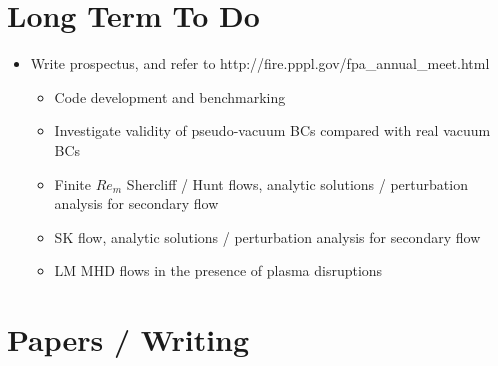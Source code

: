 \documentclass[11pt]{article}
\begin{document}
\doublespacing
\MOONSTITLE
\maketitle

\section{Long Term To Do}

\begin{itemize}
\item Write prospectus, and refer to http://fire.pppl.gov/fpa\_annual\_meet.html
\begin{itemize}
\item Code development and benchmarking
\item Investigate validity of pseudo-vacuum BCs compared with real vacuum BCs
\item Finite $Re_m$ Shercliff / Hunt flows, analytic solutions / perturbation analysis for secondary flow
\item SK flow, analytic solutions / perturbation analysis for secondary flow
\item LM MHD flows in the presence of plasma disruptions
\end{itemize}
\end{itemize}

\newpage

\section{Papers / Writing}
\end{document}
